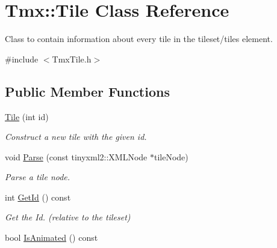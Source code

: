 \hypertarget{classTmx_1_1Tile}{\section{Tmx\-:\-:Tile Class Reference}
\label{classTmx_1_1Tile}
}


Class to contain information about every tile in the tileset/tiles element.  




{\ttfamily \#include $<$Tmx\-Tile.\-h$>$}

\subsection*{Public Member Functions}
\begin{DoxyCompactItemize}
\item 
\hypertarget{classTmx_1_1Tile_ae3320f562455e8a92879c18aaae353ac}{\hyperlink{classTmx_1_1Tile_ae3320f562455e8a92879c18aaae353ac}{Tile} (int id)}\label{classTmx_1_1Tile_ae3320f562455e8a92879c18aaae353ac}

\begin{DoxyCompactList}\small\item\em Construct a new tile with the given id. \end{DoxyCompactList}\item 
\hypertarget{classTmx_1_1Tile_a488334cb54d1d5735f636eb3b198d901}{void \hyperlink{classTmx_1_1Tile_a488334cb54d1d5735f636eb3b198d901}{Parse} (const tinyxml2\-::\-X\-M\-L\-Node $\ast$tile\-Node)}\label{classTmx_1_1Tile_a488334cb54d1d5735f636eb3b198d901}

\begin{DoxyCompactList}\small\item\em Parse a tile node. \end{DoxyCompactList}\item 
\hypertarget{classTmx_1_1Tile_a5b8c40fa159f3e52e8f74a2fa8a17b1f}{int \hyperlink{classTmx_1_1Tile_a5b8c40fa159f3e52e8f74a2fa8a17b1f}{Get\-Id} () const }\label{classTmx_1_1Tile_a5b8c40fa159f3e52e8f74a2fa8a17b1f}

\begin{DoxyCompactList}\small\item\em Get the Id. (relative to the tileset) \end{DoxyCompactList}\item 
\hypertarget{classTmx_1_1Tile_ab8993fd3a43772a14d78c0ae9a142f2a}{bool \hyperlink{classTmx_1_1Tile_ab8993fd3a43772a14d78c0ae9a142f2a}{Is\-Animated} () const }\label{classTmx_1_1Tile_ab8993fd3a43772a14d78c0ae9a142f2a}


\end{DoxyCompactItemize}
